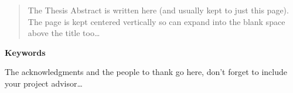 \documentclass[
11pt, %
english, %
singlespacing, %
toctotoc, %
headsepline, %
]{MastersDoctoralThesis} %
\begin{document}


\begin{abstract}
\addchaptertocentry{\abstractname} %
The Thesis Abstract is written here (and usually kept to just this page). The page is kept centered vertically so can expand into the blank space above the title too\ldots
\end{abstract}

\textbf{Keywords}

\keywordnames


\begin{acknowledgements}
\addchaptertocentry{\acknowledgementname} %
The acknowledgments and the people to thank go here, don't forget to include your project advisor\ldots
\end{acknowledgements}


\tableofcontents %

\listoffigures %

\listoftables %

\end{document}
